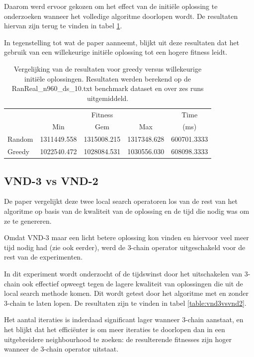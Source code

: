 \documentclass[pdftex,12pt,a4paper]{article}
\begin{document}
Daarom werd ervoor gekozen om het effect van de initi\"ele oplossing te onderzoeken wanneer het volledige algoritme doorlopen wordt. De resultaten hiervan zijn terug te vinden in tabel \ref{table:greedyvsrandom}.

In tegenstelling tot wat de paper aanneemt, blijkt uit deze resultaten dat het gebruik van een willekeurige initi\"ele oplossing tot een hogere fitness leidt.

\begin{table}
\centering
\begin{tabular}{l|c|c|c|c}
& \multicolumn{3}{c|}{Fitness} & Time\\
& Min & Gem & Max & (ms) \\\hline
Random & 1311449.558 &	1315008.215 &	1317348.628 &	600701.3333\\
Greedy & 1022540.472 & 1028084.531 &	1030556.030 &	608098.3333
\end{tabular}
\caption{Vergelijking van de resultaten voor greedy versus willekeurige initi\"ele oplossingen. Resultaten werden berekend op de  RanReal\_n960\_ds\_10.txt benchmark dataset en over zes runs uitgemiddeld.}
\label{table:greedyvsrandom}
\end{table}

\subsection{VND-3 vs VND-2}
De paper vergelijkt deze twee local search operatoren los van de rest van het algoritme op basis van de kwaliteit van de oplossing en de tijd die nodig was om ze te genereren.

Omdat VND-3 maar een licht betere oplossing kon vinden en hiervoor veel meer tijd nodig had (zie ook eerder), werd de 3-chain operator uitgeschakeld voor de rest van de experimenten.

In dit experiment wordt onderzocht of de tijdswinst door het uitschakelen van 3-chain ook effectief opweegt tegen de lagere kwaliteit van oplossingen die uit de local search methode komen.
Dit wordt getest door het algoritme met en zonder 3-chain te laten lopen. De resultaten zijn te vinden in tabel \ref{table:vnd3vsvnd2}.

Het aantal iteraties is inderdaad significant lager wanneer 3-chain aanstaat, en het blijkt dat het effici\"enter is om meer iteraties te doorlopen dan in een uitgebreidere neighbourhood te zoeken: de resulterende fitnesses zijn hoger wanneer de 3-chain operator uitstaat.
\end{document}

